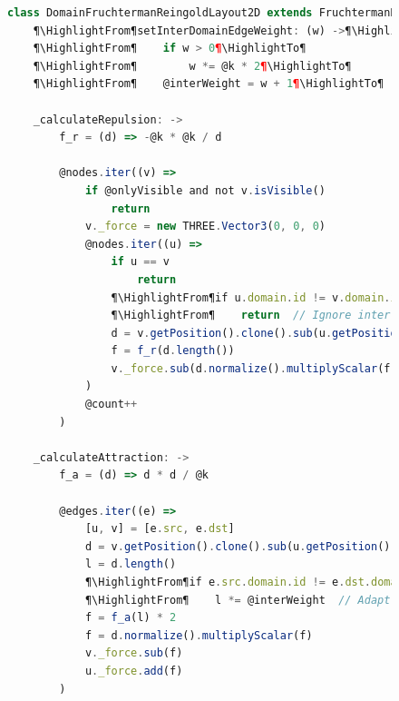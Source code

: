 \begin{figure}
\vspace{10mm}
\begin{lstlisting}[caption={Implementation of the \gls{2d} Domain Fruchterman-Reingold layout algorithm.},label=lst:domain-fr,language=javascript]
class DomainFruchtermanReingoldLayout2D extends FruchtermanReingoldLayout2D
    ¶\HighlightFrom¶setInterDomainEdgeWeight: (w) ->¶\HighlightTo¶
    ¶\HighlightFrom¶    if w > 0¶\HighlightTo¶
    ¶\HighlightFrom¶        w *= @k * 2¶\HighlightTo¶
    ¶\HighlightFrom¶    @interWeight = w + 1¶\HighlightTo¶

    _calculateRepulsion: ->
        f_r = (d) => -@k * @k / d

        @nodes.iter((v) =>
            if @onlyVisible and not v.isVisible()
                return
            v._force = new THREE.Vector3(0, 0, 0)
            @nodes.iter((u) =>
                if u == v
                    return
                ¶\HighlightFrom¶if u.domain.id != v.domain.id¶\HighlightTo¶
                ¶\HighlightFrom¶    return  // Ignore inter-domain repulsive forces¶\HighlightTo¶
                d = v.getPosition().clone().sub(u.getPosition())
                f = f_r(d.length())
                v._force.sub(d.normalize().multiplyScalar(f))
            )
            @count++
        )

    _calculateAttraction: ->
        f_a = (d) => d * d / @k

        @edges.iter((e) =>
            [u, v] = [e.src, e.dst]
            d = v.getPosition().clone().sub(u.getPosition())
            l = d.length()
            ¶\HighlightFrom¶if e.src.domain.id != e.dst.domain.id¶\HighlightTo¶
            ¶\HighlightFrom¶    l *= @interWeight  // Adapt weight of inter-domain edges¶\HighlightTo¶
            f = f_a(l) * 2
            f = d.normalize().multiplyScalar(f)
            v._force.sub(f)
            u._force.add(f)
        )
\end{lstlisting}
\vspace{10mm}
\end{figure}

